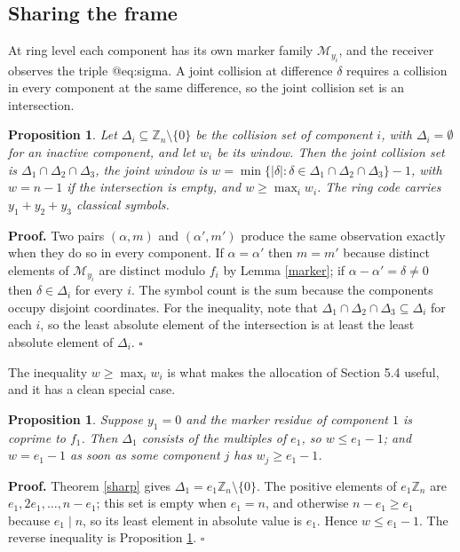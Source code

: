 \documentclass[11pt,reqno]{amsart}
\newtheorem{proposition}[theorem]{Proposition}
\theoremstyle{definition}
\theoremstyle{remark}
\newcommand{\Z}{\mathbb{Z}}
\newcommand{\M}{\mathcal{M}}
\begin{document}
\subsection{Sharing the frame}

At ring level each component has its own marker family $\M_{y_i}$, and the receiver observes the triple @eq:sigma. A joint collision at difference $\delta$ requires a collision in every component at the same difference, so the joint collision set is an intersection.


\begin{proposition}\label{joint}
Let $\Delta_i\subseteq\Z_n\setminus\{0\}$ be the collision set of component $i$, with $\Delta_i=\emptyset$ for an inactive component, and let $w_i$ be its window. Then the joint collision set is $\Delta_1\cap\Delta_2\cap\Delta_3$, the joint window is $w=\min\{|\delta|:\delta\in\Delta_1\cap\Delta_2\cap\Delta_3\}-1$, with $w=n-1$ if the intersection is empty, and $w\ge\max_iw_i$. The ring code carries $y_1+y_2+y_3$ classical symbols.
\end{proposition}

\textbf{Proof.} Two pairs $(\alpha,m)$ and $(\alpha',m')$ produce the same observation exactly when they do so in every component. If $\alpha=\alpha'$ then $m=m'$ because distinct elements of $\M_{y_i}$ are distinct modulo $f_i$ by Lemma \ref{marker}; if $\alpha-\alpha'=\delta\neq0$ then $\delta\in\Delta_i$ for every $i$. The symbol count is the sum because the components occupy disjoint coordinates. For the inequality, note that $\Delta_1\cap\Delta_2\cap\Delta_3\subseteq\Delta_i$ for each $i$, so the least absolute element of the intersection is at least the least absolute element of $\Delta_i$. $\square$


The inequality $w\ge\max_iw_i$ is what makes the allocation of Section 5.4 useful, and it has a clean special case.


\begin{proposition}\label{pinned}
Suppose $y_1=0$ and the marker residue of component $1$ is coprime to $f_1$. Then $\Delta_1$ consists of the multiples of $e_1$, so $w\le e_1-1$; and $w=e_1-1$ as soon as some component $j$ has $w_j\ge e_1-1$.
\end{proposition}

\textbf{Proof.} Theorem \ref{sharp} gives $\Delta_1=e_1\Z_n\setminus\{0\}$. The positive elements of $e_1\Z_n$ are $e_1,2e_1,\dots,n-e_1$; this set is empty when $e_1=n$, and otherwise $n-e_1\ge e_1$ because $e_1\mid n$, so its least element in absolute value is $e_1$. Hence $w\le e_1-1$. The reverse inequality is Proposition \ref{joint}. $\square$
\end{document}
